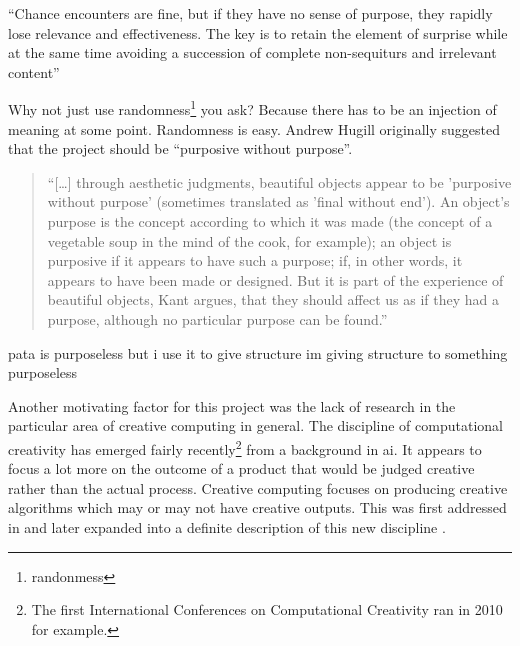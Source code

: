 
\begin{fcom}

``Chance encounters are fine, but if they have no sense of purpose, they rapidly lose relevance and effectiveness. The key is to retain the element of surprise while at the same time avoiding a succession of complete non-sequiturs and irrelevant content'' \autocite{Hendler2011}


Why not just use randomness\footnote{randonmess} you ask? Because there has to be an injection of meaning at some point. Randomness is easy. Andrew Hugill originally suggested that the project should be ``purposive without purpose''.

\begin{quote}
  ``[\ldots] through aesthetic judgments, beautiful objects appear to be 'purposive without purpose' (sometimes translated as 'final without end'). An object's purpose is the concept according to which it was made (the concept of a vegetable soup in the mind of the cook, for example); an object is purposive if it appears to have such a purpose; if, in other words, it appears to have been made or designed. But it is part of the experience of beautiful objects, Kant argues, that they should affect us as if they had a purpose, although no particular purpose can be found.'' \autocite[ch.2a]{Burnham2015}
\end{quote}

pata is purposeless but i use it to give structure
im giving structure to something purposeless
\end{fcom}



Another motivating factor for this project was the lack of research in the particular area of creative computing in general. The discipline of computational creativity has emerged fairly recently\footnote{The first International Conferences on Computational Creativity ran in 2010 for example.} from a background in \gls{ai}. It appears to focus a lot more on the outcome of a product that would be judged creative rather than the actual process. Creative computing focuses on producing creative algorithms which may or may not have creative outputs. This was first addressed in \autocite{Raczinski2013} and later expanded into a definite description of this new discipline \autocite{Hugill2013c}.


